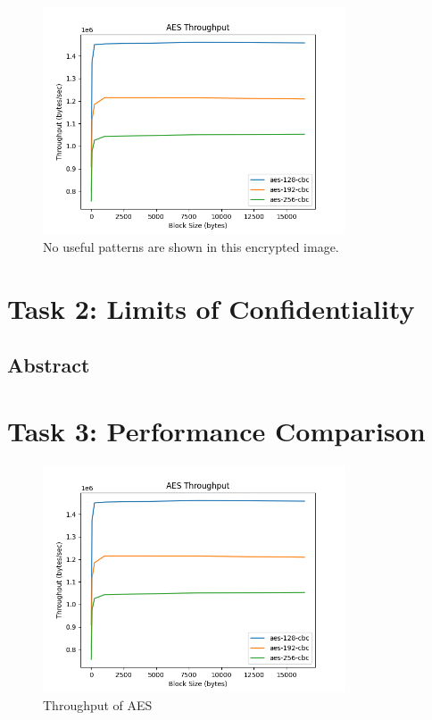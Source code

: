 \documentclass[11pt]{article}
\begin{document}
\begin{figure}
	\centering
	\includegraphics[width=0.8\textwidth]{./plts/aes.png}
	\caption{No useful patterns are shown in this encrypted image.}
	\label{fig.2: CBC Encryption}
\end{figure}

\section*{Task 2: Limits of Confidentiality}
\subsection*{Abstract}

\section*{Task 3: Performance Comparison}
\begin{figure}
	\centering
	\includegraphics[width=0.8\textwidth]{./plts/aes.png}
	\caption{Throughput of AES}
	\label{fig.3: Performance of AES}
\end{figure}
\end{document}
